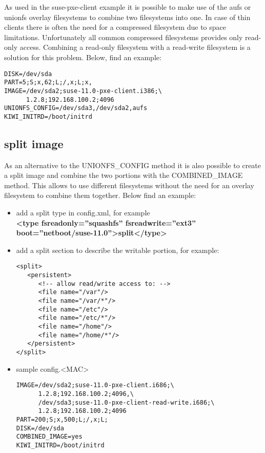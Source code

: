 As used in the suse-pxe-client example it is possible to make use of the
aufs or unionfs overlay filesystems to combine two filesystems
into one. In case of thin clients there is often the need for
a compressed filesystem due to space limitations. Unfortunately
all common compressed filesystems provides only read-only access.
Combining a read-only filesystem with a read-write filesystem
is a solution for this problem. Below, find an example:

\begin{Command}{12cm}
\begin{verbatim}
DISK=/dev/sda
PART=5;S;x,62;L;/,x;L;x,
IMAGE=/dev/sda2;suse-11.0-pxe-client.i386;\
      1.2.8;192.168.100.2;4096
UNIONFS_CONFIG=/dev/sda3,/dev/sda2,aufs
KIWI_INITRD=/boot/initrd
\end{verbatim}
\end{Command}

\subsection{split image}

As an alternative to the UNIONFS\_CONFIG method it is also
possible to create a split image and combine the two portions
with the COMBINED\_IMAGE method. This allows to use different
filesystems without the need for an overlay filesystem to combine
them together. Below find an example:

\begin{itemize}
\item add a split type in config.xml, for example\\
      \textbf{<type fsreadonly=''squashfs'' fsreadwrite=''ext3''
      boot=''netboot/suse-11.0''>split</type>}
\item add a split section to describe the writable portion,
      for example:
\begin{verbatim}
<split>
   <persistent>
      <!-- allow read/write access to: -->
      <file name="/var"/>
      <file name="/var/*"/>
      <file name="/etc"/>
      <file name="/etc/*"/>
      <file name="/home"/>
      <file name="/home/*"/>
   </persistent>
</split>
\end{verbatim}
\item sample config.<MAC>
     
\begin{Command}{14cm}
\begin{verbatim}
IMAGE=/dev/sda2;suse-11.0-pxe-client.i686;\
      1.2.8;192.168.100.2;4096,\
      /dev/sda3;suse-11.0-pxe-client-read-write.i686;\
      1.2.8;192.168.100.2;4096
PART=200;S;x,500;L;/,x;L;
DISK=/dev/sda
COMBINED_IMAGE=yes
KIWI_INITRD=/boot/initrd
\end{verbatim}
\end{Command}
\end{itemize}

